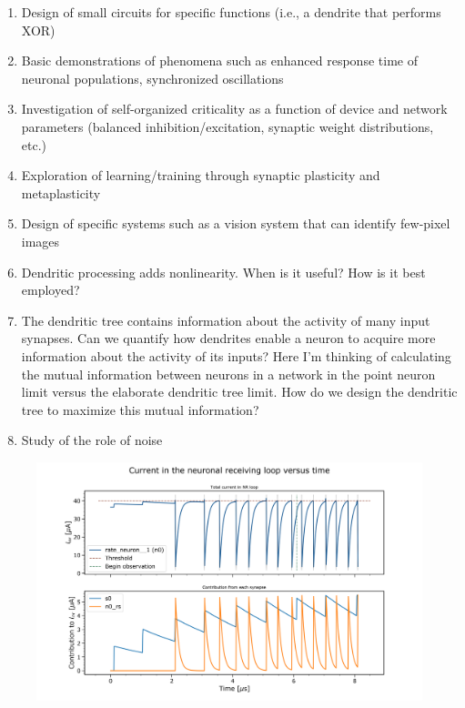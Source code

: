 \documentclass[]{article}
\begin{document}
\begin{enumerate}
\item Design of small circuits for specific functions (i.e., a dendrite that performs XOR)
\item Basic demonstrations of phenomena such as enhanced response time of neuronal populations, synchronized oscillations
\item Investigation of self-organized criticality as a function of device and network parameters (balanced inhibition/excitation, synaptic weight distributions, etc.)
\item Exploration of learning/training through synaptic plasticity and metaplasticity
\item Design of specific systems such as a vision system that can identify few-pixel images
\item Dendritic processing adds nonlinearity. When is it useful? How is it best employed?
\item The dendritic tree contains information about the activity of many input synapses. Can we quantify how dendrites enable a neuron to acquire more information about the activity of its inputs? Here I'm thinking of calculating the mutual information between neurons in a network in the point neuron limit versus the elaborate dendritic tree limit. How do we design the dendritic tree to maximize this mutual information?
\item Study of the role of noise
\end{enumerate}

\begin{figure}[t!]
\centering
\includegraphics[width=17.2cm]{test_fig.png}
\end{figure}
\end{document}

